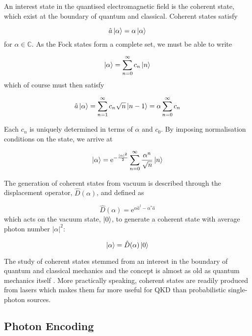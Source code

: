 An interest state in the quantised electromagnetic field is the coherent state, which exist at the boundary of quantum and classical. Coherent states satisfy 

\begin{equation}
	\hat{a}\ket{\alpha} = \alpha\ket{\alpha}
\end{equation}
for $\alpha \in \mathbb{C}$. As the Fock states form a complete set, we must be able to write

\begin{equation}
	\ket{\alpha} = \sum_{n=0}^\infty c_n \ket{n}
\end{equation}
which of course must then satisfy

\begin{equation}
	\hat{a}\ket{\alpha} = \sum_{n=1}^\infty c_n \sqrt{n} \ket{n-1} = \alpha  \sum_{n=0}^\infty c_n
\end{equation}

Each $c_n$ is uniquely determined in terms of $\alpha$ and $c_0$. By imposing normalisation conditions on the state, we arrive at

\begin{equation}
	\ket{\alpha} = \mathrm{e}^{-\frac{|\alpha|^2}{2}} \sum_{n=0}^\infty \frac{\alpha^n}{\sqrt{n}} \ket{n} 
\end{equation}

The generation of coherent states from vacuum is described through the displacement operator, $\hat{D}(\alpha)$, and defined as

\begin{equation}
	\hat{D}(\alpha) = \mathrm{e}^{\alpha\hat{a}^\dagger - \alpha^\ast\hat{a}}
\end{equation}
which acts on the vacuum state, $\ket{0}$, to generate a coherent state with average photon number $|\alpha|^2$:

\begin{equation}
	\ket{\alpha} = \hat{D}(\alpha)\ket{0}
\end{equation}

The study of coherent states stemmed from an interest in the boundary of quantum and classical mechanics and the concept is almost as old as quantum mechanics itself \cite{Schrodinger1926}. More practically speaking, coherent states are readily produced from lasers which makes them far more useful for \ac{QKD} than probabilistic single-photon sources.

\subsection{Photon Encoding}
\label{sec:photon_encoding}

